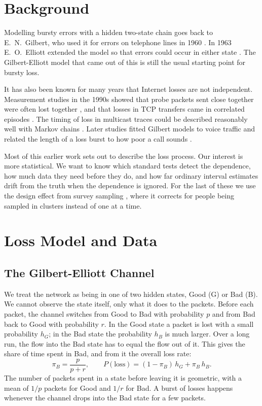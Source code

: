 \documentclass[conference]{IEEEtran}
\begin{document}
\section{Background}
Modelling bursty errors with a hidden two-state chain goes back to E.~N.~Gilbert, who used it for errors on telephone lines in 1960 \cite{gilbert1960}. In 1963 E.~O.~Elliott extended the model so that errors could occur in either state \cite{elliott1963}. The Gilbert-Elliott model that came out of this is still the usual starting point for bursty loss.

It has also been known for many years that Internet losses are not independent. Measurement studies in the 1990s showed that probe packets sent close together were often lost together \cite{bolot1993}, and that losses in TCP transfers came in correlated episodes \cite{paxson1997}. The timing of loss in multicast traces could be described reasonably well with Markov chains \cite{yajnik1999}. Later studies fitted Gilbert models to voice traffic and related the length of a loss burst to how poor a call sounds \cite{jiang2000,hasslinger2008}.

Most of this earlier work sets out to describe the loss process. Our interest is more statistical. We want to know which standard tests detect the dependence, how much data they need before they do, and how far ordinary interval estimates drift from the truth when the dependence is ignored. For the last of these we use the design effect from survey sampling \cite{kish1965}, where it corrects for people being sampled in clusters instead of one at a time.

\section{Loss Model and Data}
\subsection{The Gilbert-Elliott Channel}
We treat the network as being in one of two hidden states, Good (G) or Bad (B). We cannot observe the state itself, only what it does to the packets. Before each packet, the channel switches from Good to Bad with probability $p$ and from Bad back to Good with probability $r$. In the Good state a packet is lost with a small probability $h_G$; in the Bad state the probability $h_B$ is much larger. Over a long run, the flow into the Bad state has to equal the flow out of it. This gives the share of time spent in Bad, and from it the overall loss rate:
\begin{equation}
\pi_B=\frac{p}{p+r},\qquad P(\text{loss})=(1-\pi_B)\,h_G+\pi_B\,h_B .
\label{eq:ge}
\end{equation}
The number of packets spent in a state before leaving it is geometric, with a mean of $1/p$ packets for Good and $1/r$ for Bad. A burst of losses happens whenever the channel drops into the Bad state for a few packets.
\end{document}
